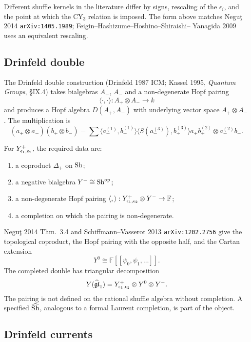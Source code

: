 Different shuffle kernels in the literature differ by signs, rescaling
of the $\epsilon_i$, and the point at which the CY$_3$ relation is
imposed. The form above matches Negu\c{t} 2014
\texttt{arXiv:1405.1989}; Feigin--Hashizume--Hoshino--Shiraishi--
Yanagida 2009 uses an equivalent rescaling.

\subsection{Drinfeld double}
\label{wn:subsec:yplus-drinfeld-double}

The Drinfeld double construction (Drinfeld 1987 ICM; Kassel 1995,
\emph{Quantum Groups}, §IX.4) takes bialgebras $A_+$, $A_-$ and a
non-degenerate Hopf pairing
\[
\langle\cdot,\cdot\rangle:A_+\otimes A_-\to k
\]
and produces a Hopf algebra $D(A_+,A_-)$ with underlying vector space
$A_+\otimes A_-$. The multiplication is
\[
(a_+\otimes a_-)(b_+\otimes b_-)
=\sum
\langle a_-^{(1)},b_+^{(1)}\rangle
\langle S(a_-^{(3)}),b_+^{(3)}\rangle
a_+b_+^{(2)}\otimes a_-^{(2)}b_-.
\]

For $Y^+_{\epsilon_1, \epsilon_2}$, the required data are:
\begin{enumerate}
\item a coproduct $\Delta_+$ on $\mathrm{Sh}$;
\item a negative bialgebra $Y^-\cong\mathrm{Sh}^{\mathrm{op}}$;
\item a non-degenerate Hopf pairing
    $\langle,\rangle:Y^+_{\epsilon_1, \epsilon_2}\otimes Y^-\to\mathbb F$;
\item a completion on which the pairing is non-degenerate.
\end{enumerate}

Negu\c{t} 2014 Thm.\ 3.4 and Schiffmann--Vasserot 2013
\texttt{arXiv:1202.2756} give the topological coproduct, the Hopf
pairing with the opposite half, and the Cartan extension
\[
Y^0\cong \mathbb F[\![\psi_0,\psi_1,\ldots]\!].
\]
The completed double has triangular decomposition
\[
Y(\widehat{\mathfrak{gl}}_1)=Y^+_{\epsilon_1, \epsilon_2}\otimes Y^0\otimes Y^-.
\]
The pairing is not defined on the rational shuffle algebra without
completion. A specified $\widehat{\mathrm{Sh}}$, analogous to a formal Laurent
completion, is part of the object.

\subsection{Drinfeld currents}
\label{wn:subsec:yplus-loop-presentation}

